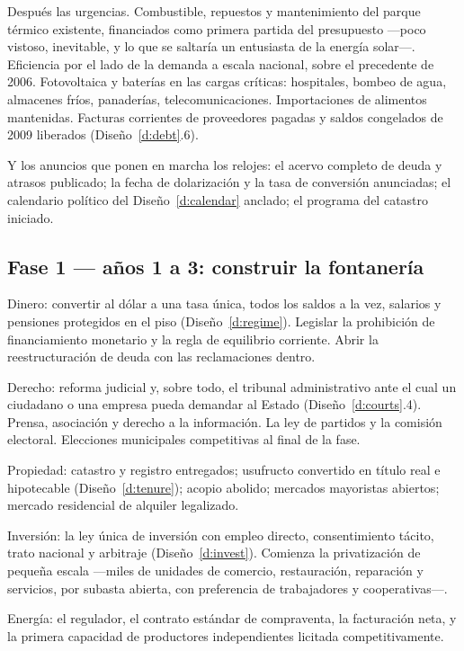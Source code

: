 Después las urgencias. Combustible, repuestos y mantenimiento del parque térmico existente,
financiados como primera partida del presupuesto ---poco vistoso, inevitable, y lo que se saltaría
un entusiasta de la energía solar---. Eficiencia por el lado de la demanda a escala nacional, sobre
el precedente de 2006. Fotovoltaica y baterías en las cargas críticas: hospitales, bombeo de agua,
almacenes fríos, panaderías, telecomunicaciones. Importaciones de alimentos mantenidas. Facturas
corrientes de proveedores pagadas y saldos congelados de 2009 liberados (Diseño~\ref{d:debt}.6).

Y los anuncios que ponen en marcha los relojes: el acervo completo de deuda y atrasos publicado; la
fecha de dolarización y la tasa de conversión anunciadas; el calendario político del
Diseño~\ref{d:calendar} anclado; el programa del catastro iniciado.

\subsection*{Fase 1 --- años 1 a 3: construir la fontanería}

Dinero: convertir al dólar a una tasa única, todos los saldos a la vez, salarios y pensiones
protegidos en el piso (Diseño~\ref{d:regime}). Legislar la prohibición de financiamiento monetario y
la regla de equilibrio corriente. Abrir la reestructuración de deuda con las reclamaciones dentro.

Derecho: reforma judicial y, sobre todo, el tribunal administrativo ante el cual un ciudadano o una
empresa pueda demandar al Estado (Diseño~\ref{d:courts}.4). Prensa, asociación y derecho a la
información. La ley de partidos y la comisión electoral. Elecciones municipales competitivas al
final de la fase.

Propiedad: catastro y registro entregados; usufructo convertido en título real e hipotecable
(Diseño~\ref{d:tenure}); acopio abolido; mercados mayoristas abiertos; mercado residencial de
alquiler legalizado.

Inversión: la ley única de inversión con empleo directo, consentimiento tácito, trato nacional y
arbitraje (Diseño~\ref{d:invest}). Comienza la privatización de pequeña escala ---miles de unidades
de comercio, restauración, reparación y servicios, por subasta abierta, con preferencia de
trabajadores y cooperativas---.

Energía: el regulador, el contrato estándar de compraventa, la facturación neta, y la primera
capacidad de productores independientes licitada competitivamente.

